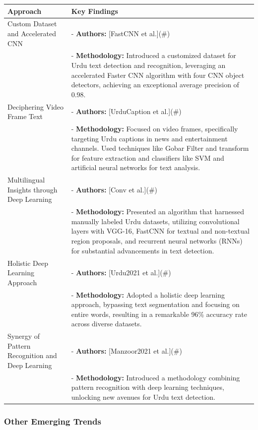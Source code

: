 \documentclass[default,iicol]{sn-jnl}%
\begin{document}
	\begin{table}[ht]
		\centering
		\begin{tabular}{|p{3cm}|p{6cm}|}
			\hline
			\textbf{Approach} & \textbf{Key Findings} \\
			\hline
			Custom Dataset and Accelerated CNN & 
			- \textbf{Authors:} [FastCNN et al.](\#) \\
			& - \textbf{Methodology:} Introduced a customized dataset for Urdu text detection and recognition, leveraging an accelerated Faster CNN algorithm with four CNN object detectors, achieving an exceptional average precision of 0.98. \\
			\hline
			Deciphering Video Frame Text & 
			- \textbf{Authors:} [UrduCaption et al.](\#) \\
			& - \textbf{Methodology:} Focused on video frames, specifically targeting Urdu captions in news and entertainment channels. Used techniques like Gobar Filter and transform for feature extraction and classifiers like SVM and artificial neural networks for text analysis. \\
			\hline
			Multilingual Insights through Deep Learning & 
			- \textbf{Authors:} [Conv et al.](\#) \\
			& - \textbf{Methodology:} Presented an algorithm that harnessed manually labeled Urdu datasets, utilizing convolutional layers with VGG-16, FastCNN for textual and non-textual region proposals, and recurrent neural networks (RNNs) for substantial advancements in text detection. \\
			\hline
			Holistic Deep Learning Approach & 
			- \textbf{Authors:} [Urdu2021 et al.](\#) \\
			& - \textbf{Methodology:} Adopted a holistic deep learning approach, bypassing text segmentation and focusing on entire words, resulting in a remarkable 96\% accuracy rate across diverse datasets. \\
			\hline
			Synergy of Pattern Recognition and Deep Learning & 
			- \textbf{Authors:} [Manzoor2021 et al.](\#) \\
			& - \textbf{Methodology:} Introduced a methodology combining pattern recognition with deep learning techniques, unlocking new avenues for Urdu text detection. \\
			\hline
		\end{tabular}
	\end{table}
	
	\subsubsection{Other Emerging Trends}
	
\end{document}

